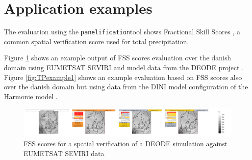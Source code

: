 \documentclass[11pt,a4paper]{article}
\newcommand{\panel}{\texttt{panelification}}
\begin{document}
\section{Application examples}
The evaluation using the \panel tool shows Fractional Skill Scores \cite{FSS}, a common spatial verification
score used for total precipitation.

Figure \ref{fig:IRexample} shows an example output of FSS scores
evaluation over the danish domain using EUMETSAT SEVIRI and model data from the DEODE project \cite{deode}.
Figure \ref{fig:TPexample1} shows an example evaluation based on FSS scores also over
the danish domain but using data from the DINI model configuration of the Harmonie model \cite{dini}.

\begin{figure}[htbp]
    \centering
    \includegraphics[width=1.2\textwidth]{../PLOTS/panel_IR_108_202401022300+23}
    \caption{FSS scores for a spatial verification of a DEODE simulation against EUMETSAT SEVIRI data}
    \label{fig:IRexample}
\end{figure}
\end{document}
